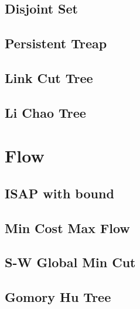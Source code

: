 \documentclass[a4paper,10pt,twocolumn,oneside]{article}
\begin{document}
\subsection{Disjoint Set}


\subsection{Persistent Treap}


%

\subsection{Link Cut Tree}


\subsection{Li Chao Tree}


\section{Flow}
\subsection{ISAP with bound}


\subsection{Min Cost Max Flow}


\subsection{S-W Global Min Cut}


\subsection{Gomory Hu Tree}

\end{document}

